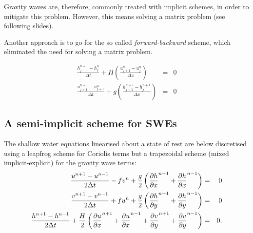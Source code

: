 
Gravity waves are, therefore, commonly treated with implicit schemes, in order to mitigate this problem. However, this means solving a matrix problem (see following slides).	



Another approach is to go for the so called \emph{forward-backward} scheme, which eliminated the need for solving a matrix problem.

\begin{eqnarray}
	\frac{h_{j}^{n+1} - h_{j}^{n}}{\Delta t}  + H \left(  \frac{u_{j+1}^{n} - u_{j}^{n}}{\Delta x}  \right)  & = & 0 \\
	\frac{u_{j+1}^{n+1} - u_{j+1}^{n}}{\Delta t}  + g \left( \frac{h_{j+1}^{n+1} - h_{j}^{n+1}}{\Delta x}   \right)  & = & 0 
\end{eqnarray}

\subsection{A semi-implicit scheme for SWEs}

The shallow water equations linearised about a state of rest are below
discretised using a leapfrog scheme for Coriolis terms but a
trapezoidal scheme (mixed implicit-explicit) for the gravity wave
terms:
\begin{eqnarray*}
	\frac{u^{n+1}-u^{n-1}}{2\Delta t}-fv^n+\frac{g}{2}
	\left( \frac{\partial h}{\partial x}^{n+1} +\frac{\partial h}{\partial x}^{n-1} \right) & = & 0 \\
	\frac{v^{n+1}-v^{n-1}}{2\Delta t}+fu^n+\frac{g}{2}
	\left( \frac{\partial h}{\partial y}^{n+1} +\frac{\partial h}{\partial y}^{n-1} \right) & = & 0 \\
	\frac{h^{n+1}-h^{n-1}}{2\Delta t}+\frac{H}{2}
	\left( \frac{\partial u}{\partial x}^{n+1} +\frac{\partial u}{\partial x}^{n-1}
	+\frac{\partial v}{\partial y}^{n+1} +\frac{\partial v}{\partial y}^{n-1} 
	\right) & = & 0. 
\end{eqnarray*}

